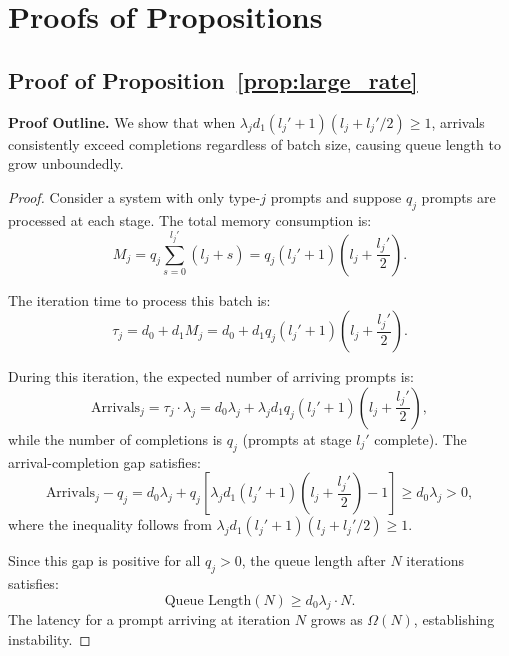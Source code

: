%
%
%


\section{Proofs of Propositions}

\subsection{Proof of Proposition~\ref{prop:large_rate}}
\label{appendix:proof_large_rate}

\noindent\textbf{Proof Outline.} We show that when $\lambda_j d_1 (l_j'+1)(l_j + l_j'/2) \geq 1$, arrivals consistently exceed completions regardless of batch size, causing queue length to grow unboundedly.

\begin{proof}
Consider a system with only type-$j$ prompts and suppose \(q_j\) prompts are processed at each stage. The total memory consumption is:
$$M_j = q_j\sum_{s=0}^{l_j'}(l_j + s) = q_j(l_j'+1) \left(l_j + \frac{l_j'}{2}\right).$$

The iteration time to process this batch is:
$$\tau_j = d_0 + d_1 M_j = d_0 + d_1 q_j(l_j'+1) \left(l_j + \frac{l_j'}{2}\right).$$

During this iteration, the expected number of arriving prompts is:
$$\text{Arrivals}_j = \tau_j \cdot \lambda_j = d_0\lambda_j + \lambda_j d_1 q_j(l_j'+1) \left(l_j + \frac{l_j'}{2}\right),$$
while the number of completions is $q_j$ (prompts at stage $l_j'$ complete). The arrival-completion gap satisfies:
$$\text{Arrivals}_j - q_j = d_0\lambda_j + q_j\left[\lambda_j d_1 (l_j'+1)\left(l_j + \frac{l_j'}{2}\right) - 1\right] \geq d_0\lambda_j > 0,$$
where the inequality follows from $\lambda_j d_1 (l_j'+1)(l_j + l_j'/2) \geq 1$.

Since this gap is positive for all $q_j > 0$, the queue length after $N$ iterations satisfies:
$$\text{Queue Length}(N) \geq d_0\lambda_j \cdot N.$$
The latency for a prompt arriving at iteration $N$ grows as $\Omega(N)$, establishing instability.
\end{proof}

